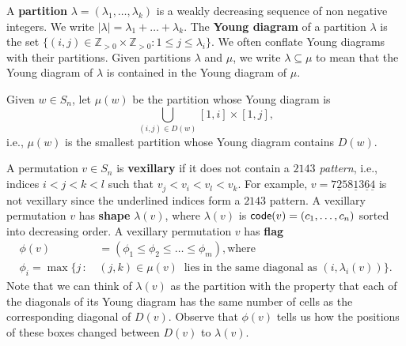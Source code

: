 \documentclass[12pt]{amsart}
\newtheorem{theorem}{Theorem}[section]
\theoremstyle{definition}
\newenvironment{example}
  {\pushQED{\qed}\renewcommand{\qedsymbol}{$\diamondsuit$}\examplex}
  {\popQED\endexamplex}
\theoremstyle{remark}
\numberwithin{equation}{section}
\newcommand{\code}{{\sf code}}
\newcommand\mydef[1]{{\bf #1}}
\newcommand{\Sym}{S}
\newcommand{\reg}{{\rm reg}}
\newcommand{\maxsizediag}{\rho_d}
\begin{document}


A \mydef{partition} $\lambda=(\lambda_1,\dots,\lambda_k)$ is a weakly decreasing sequence of non negative integers.  We write $|\lambda|=\lambda_1+\dots+\lambda_k$.  The \mydef{Young diagram} of a partition $\lambda$ is the set $\{(i,j)\in \mathbb Z_{>0}\times \mathbb Z_{>0}:1\leq j\leq \lambda_i\}$.  We often conflate Young diagrams with their partitions. Given partitions $\lambda$ and $\mu$, we write $\lambda\subseteq \mu$ to mean that the Young diagram of $\lambda$ is contained in the Young diagram of $\mu$.

Given $w\in S_n$, let $\mu(w)$ be the partition whose Young diagram is \[\bigcup_{(i,j)\in D(w)}[1,i]\times[1,j],\]
i.e., $\mu(w)$ is the smallest partition whose Young diagram contains $D(w)$.

A permutation $v\in \Sym_n$ is \mydef{vexillary} if it does not contain a \emph{$2143$ pattern}, i.e., indices
$i<j<k<l$ such that $v_j<v_i<v_l<v_k$. 
For example, $v=7\underline{2}58\underline{1}3\underline{6}\underline{4}$ is not vexillary since the underlined indices form a $2143$ pattern. 
A vexillary permutation $v$ has \mydef{shape} $\lambda(v)$, where $\lambda(v)$ is
$\code(v)=(c_1,\ldots,c_n)$ sorted into decreasing order.
A vexillary permutation $v$ has \mydef{flag}
\begin{align*}
    \phi(v)&=(\phi_1\leq \phi_2\leq\dots\leq \phi_m), \text{where}\\
    \phi_i=\max\{j \,:  \, &(j,k)\in \mu(v) \ \text{ lies in the same diagonal as } (i,\lambda_i(v))\}.
\end{align*}
Note that we can think of $\lambda(v)$ as the partition with
 the property that each of the diagonals of its Young diagram has the same number of cells as the corresponding diagonal of $D(v)$.
 Observe that $\phi(v)$ tells us how the positions of these boxes changed between $D(v)$ to $\lambda(v)$.
\end{document}
